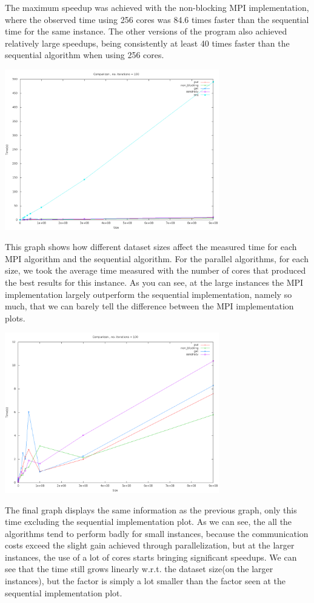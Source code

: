 \documentclass[11pt]{article}
\begin{document}
The maximum speedup was achieved with the non-blocking MPI implementation, where the observed time using 256 cores was 84.6 times faster than the sequential time for the same instance. The other versions of the
program also achieved relatively large speedups, being consistently at least 40 times faster than the sequential algorithm when using 256 cores.
\begin{center}
\includegraphics[width=0.7\textwidth]{cmpsxt.png}
\end{center}
This graph shows how different dataset sizes affect the measured time for each MPI algorithm and the sequential algorithm. For the parallel algorithms, for each size, we took the average time measured with the number of cores
that produced the best results for this instance. As you can see, at the large instances the MPI implementation largely outperform the sequential implementation, namely so much, that we can barely tell the difference between the
MPI implementation plots.
\begin{center}
\includegraphics[width=0.7\textwidth]{cmpsxtnoseq.png}
\end{center}
The final graph displays the same information as the previous graph, only this time excluding the sequential implementation plot.
As we can see, the all the algorithms tend to perform badly for small instances, because the communication costs exceed the slight gain
achieved through parallelization, but at the larger instances, the use of a lot of cores starts bringing significant speedups. We can see
that the time still grows linearly w.r.t. the dataset size(on the larger instances), but the factor is simply a lot smaller than the factor seen
at the sequential implementation plot.
\end{document}
